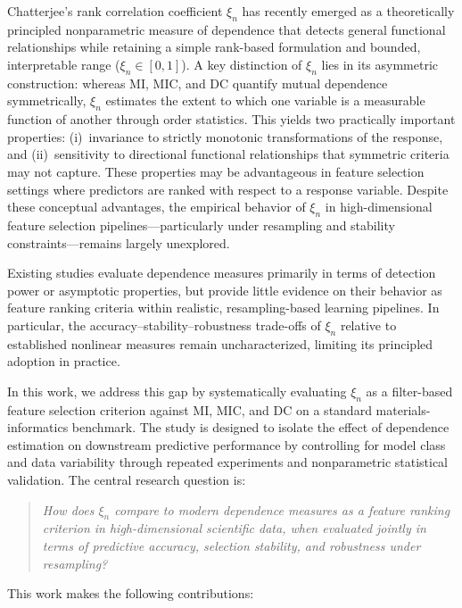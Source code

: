 \documentclass[twoside,11pt]{article}
\begin{document}
Chatterjee's rank correlation coefficient $\xi_n$ \citep{Chatterjee2021} has
recently emerged as a theoretically principled nonparametric measure of dependence
that detects general functional relationships while retaining a simple rank-based
formulation and bounded, interpretable range ($\xi_n \in [0,1]$). A key
distinction of $\xi_n$ lies in its asymmetric construction: whereas MI, MIC,
and DC quantify mutual dependence symmetrically, $\xi_n$ estimates the extent
to which one variable is a measurable function of another through order
statistics. This yields two practically important properties: (i)~invariance to
strictly monotonic transformations of the response, and (ii)~sensitivity to
directional functional relationships that symmetric criteria may not capture.
These properties may be advantageous in feature selection settings where
predictors are ranked with respect to a response variable. Despite these 
conceptual advantages, the empirical behavior of $\xi_n$ in high-dimensional 
feature selection pipelines—particularly under resampling and stability 
constraints—remains largely unexplored.

Existing studies evaluate dependence measures primarily in
terms of detection power or asymptotic properties, but provide little evidence
on their behavior as feature ranking criteria within realistic, resampling-based
learning pipelines. In particular, the accuracy--stability--robustness trade-offs
of $\xi_n$ relative to established nonlinear measures remain uncharacterized,
limiting its principled adoption in practice.

In this work, we address this gap by systematically evaluating $\xi_n$ as a
filter-based feature selection criterion against MI, MIC, and DC on a standard
materials-informatics benchmark. The study is designed to isolate the effect of
dependence estimation on downstream predictive performance by controlling for
model class and data variability through repeated experiments and nonparametric
statistical validation. The central research question is:

\begin{quote}
\emph{How does $\xi_n$ compare to modern dependence measures as a feature
ranking criterion in high-dimensional scientific data, when evaluated jointly
in terms of predictive accuracy, selection stability, and robustness under
resampling?}
\end{quote}

This work makes the following contributions:
\end{document}
